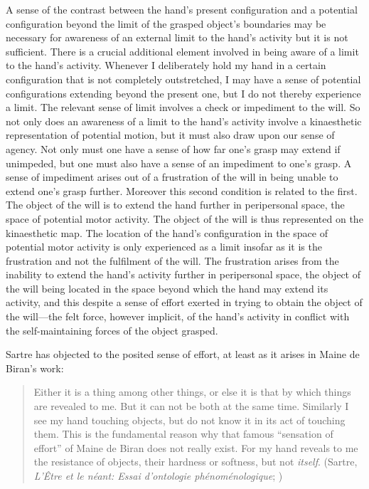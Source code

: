 A sense of the contrast between the hand's present configuration and a potential configuration beyond the limit of the grasped object's boundaries may be necessary for awareness of an external limit to the hand's activity but it is not sufficient. There is a crucial additional element involved in being aware of a limit to the hand's activity. Whenever I deliberately hold my hand in a certain configuration that is not completely outstretched, I may have a sense of potential configurations extending beyond the present one, but I do not thereby experience a limit. The relevant sense of limit involves a check or impediment to the will. So not only does an awareness of a limit to the hand's activity involve a kinaesthetic representation of potential motion, but it must also draw upon our sense of agency. Not only must one have a sense of how far one's grasp may extend if unimpeded, but one must also have a sense of an impediment to one's grasp. A sense of impediment arises out of a frustration of the will in being unable to extend one's grasp further. Moreover this second condition is related to the first. The object of the will is to extend the hand further in peripersonal space, the space of potential motor activity. The object of the will is thus represented on the kinaesthetic map. The location of the hand's configuration in the space of potential motor activity is only experienced as a limit insofar as it is the frustration and not the fulfilment of the will. The frustration arises from the inability to extend the hand's activity further in peripersonal space, the object of the will being located in the space beyond which the hand may extend its activity, and this despite a sense of effort exerted in trying to obtain the object of the will---the felt force, however implicit, of the hand's activity in conflict with the self-maintaining forces of the object grasped.

Sartre has objected to the posited sense of effort, at least as it arises in Maine de Biran's work:
\begin{quote}
	Either it is a thing among other things, or else it is that by which things are revealed to me. But it can not be both at the same time. Similarly I see my hand touching objects, but do not know it in its act of touching them. This is the fundamental reason why that famous ``sensation of effort'' of Maine de Biran does not really exist. For my hand reveals to me the resistance of objects, their hardness or softness, but not \emph{itself}. (Sartre, \emph{L'Être et le néant: Essai d'ontologie phénoménologique}; \citealt[304]{Barnes:1958rt})
\end{quote}

